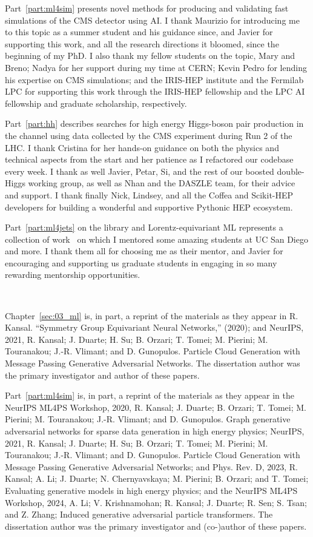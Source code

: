 Part~\ref{part:ml4sim} presents novel methods for producing and validating fast simulations of the CMS detector using AI.
I thank Maurizio for introducing me to this topic as a summer student and his guidance since, and Javier for supporting this work, and all the research directions it bloomed, since the beginning of my PhD.
I also thank my fellow students on the topic, Mary and Breno; Nadya for her support during my time at CERN; Kevin Pedro for lending his expertise on CMS simulations; and the IRIS-HEP institute and the Fermilab LPC for supporting this work through the IRIS-HEP fellowship and the LPC AI fellowship and graduate scholarship, respectively.

Part~\ref{part:hh} describes searches for high energy Higgs-boson pair production in the \bbvv channel using data collected by the CMS experiment during Run 2 of the LHC.
I thank Cristina for her hands-on guidance on both the physics and technical aspects from the start and her patience as I refactored our codebase every week.
I thank as well Javier, Petar, Si, and the rest of our boosted double-Higgs working group, as well as Nhan and the DASZLE team, for their advice and support.
I thank finally Nick, Lindsey, and all the Coffea and Scikit-HEP developers for building a wonderful and supportive Pythonic HEP ecosystem.

Part~\ref{part:ml4jets} on the \jetnet library and Lorentz-equivariant ML represents a collection of work~\cite{Kansal:2023iqy, Tsan:2021brw, Hao:2022zns} on which I mentored some amazing students at UC San Diego and more.
I thank them all
for choosing me as their mentor, and Javier for encouraging and supporting us graduate students in engaging in so many rewarding mentorship opportunities.

\

Chapter~\ref{sec:03_ml} is, in part, a reprint of the materials as they appear in
R. Kansal. ``Symmetry Group Equivariant Neural Networks,'' (2020);
and
NeurIPS, 2021, R. Kansal; J. Duarte; H. Su; B. Orzari; T. Tomei; M. Pierini; M. Touranakou; J.-R. Vlimant; and D. Gunopulos. Particle Cloud Generation with Message Passing Generative Adversarial Networks.
The dissertation author was the primary investigator and author of these papers.

Part~\ref{part:ml4sim} is, in part, a reprint of the materials as they appear in
the NeurIPS ML4PS Workshop, 2020, R. Kansal; J. Duarte; B. Orzari; T. Tomei; M. Pierini; M. Touranakou; J.-R. Vlimant; and D. Gunopulos. Graph generative adversarial networks for sparse data generation in high energy physics;
NeurIPS, 2021, R. Kansal; J. Duarte; H. Su; B. Orzari; T. Tomei; M. Pierini; M. Touranakou; J.-R. Vlimant; and D. Gunopulos. Particle Cloud Generation with Message Passing Generative Adversarial Networks; and
Phys. Rev. D, 2023, R. Kansal; A. Li; J. Duarte; N. Chernyavskaya; M. Pierini; B. Orzari; and T. Tomei; Evaluating generative models in high energy physics; and
the NeurIPS ML4PS Workshop, 2024, A. Li; V. Krishnamohan; R. Kansal; J. Duarte; R. Sen; S. Tsan; and Z. Zhang; Induced generative adversarial particle transformers.
The dissertation author was the primary investigator and (co-)author of these papers.

